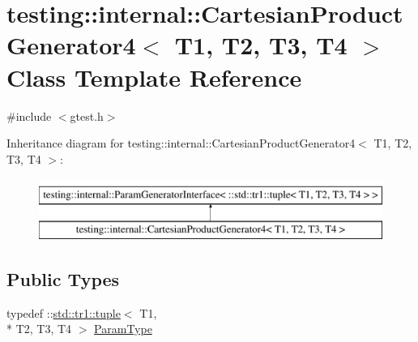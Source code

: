 \hypertarget{classtesting_1_1internal_1_1_cartesian_product_generator4}{\section{testing\-:\-:internal\-:\-:Cartesian\-Product\-Generator4$<$ T1, T2, T3, T4 $>$ Class Template Reference}
\label{classtesting_1_1internal_1_1_cartesian_product_generator4}
}


{\ttfamily \#include $<$gtest.\-h$>$}

Inheritance diagram for testing\-:\-:internal\-:\-:Cartesian\-Product\-Generator4$<$ T1, T2, T3, T4 $>$\-:\begin{figure}[H]
\begin{center}
\leavevmode
\includegraphics[height=2.000000cm]{classtesting_1_1internal_1_1_cartesian_product_generator4}
\end{center}
\end{figure}
\subsection*{Public Types}
\begin{DoxyCompactItemize}
\item 
typedef \-::\hyperlink{classstd_1_1tr1_1_1tuple}{std\-::tr1\-::tuple}$<$ T1, \\*
T2, T3, T4 $>$ \hyperlink{classtesting_1_1internal_1_1_cartesian_product_generator4_ac8cc31e9f7b2d0b7ee725a60f82edb78}{Param\-Type}
\end{DoxyCompactItemize}

